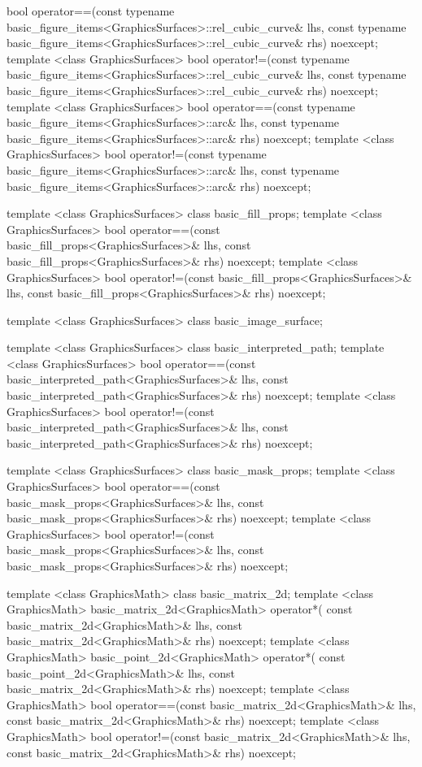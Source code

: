 \begin{codeblock}
{{{{    bool operator==(const typename 
      basic_figure_items<GraphicsSurfaces>::rel_cubic_curve& lhs,
      const typename basic_figure_items<GraphicsSurfaces>::rel_cubic_curve& 
      rhs) noexcept;
    template <class GraphicsSurfaces>
    bool operator!=(const typename 
      basic_figure_items<GraphicsSurfaces>::rel_cubic_curve& lhs,
      const typename basic_figure_items<GraphicsSurfaces>::rel_cubic_curve& 
      rhs) noexcept;
    template <class GraphicsSurfaces>
    bool operator==(const typename basic_figure_items<GraphicsSurfaces>::arc& 
      lhs, const typename basic_figure_items<GraphicsSurfaces>::arc& rhs) 
      noexcept;
    template <class GraphicsSurfaces>
    bool operator!=(const typename basic_figure_items<GraphicsSurfaces>::arc& 
      lhs, const typename basic_figure_items<GraphicsSurfaces>::arc& rhs) 
      noexcept;
    
    template <class GraphicsSurfaces>
    class basic_fill_props;
    template <class GraphicsSurfaces>
    bool operator==(const basic_fill_props<GraphicsSurfaces>& lhs,
      const basic_fill_props<GraphicsSurfaces>& rhs) noexcept;
    template <class GraphicsSurfaces>
    bool operator!=(const basic_fill_props<GraphicsSurfaces>& lhs,
      const basic_fill_props<GraphicsSurfaces>& rhs) noexcept;
    
    template <class GraphicsSurfaces>
    class basic_image_surface;
    
    template <class GraphicsSurfaces>
    class basic_interpreted_path;
    template <class GraphicsSurfaces>
    bool operator==(const basic_interpreted_path<GraphicsSurfaces>& lhs,
      const basic_interpreted_path<GraphicsSurfaces>& rhs) noexcept;
    template <class GraphicsSurfaces>
    bool operator!=(const basic_interpreted_path<GraphicsSurfaces>& lhs,
      const basic_interpreted_path<GraphicsSurfaces>& rhs) noexcept;
    
    
    template <class GraphicsSurfaces>
    class basic_mask_props;
    template <class GraphicsSurfaces>
    bool operator==(const basic_mask_props<GraphicsSurfaces>& lhs,
      const basic_mask_props<GraphicsSurfaces>& rhs) noexcept;
    template <class GraphicsSurfaces>
    bool operator!=(const basic_mask_props<GraphicsSurfaces>& lhs,
      const basic_mask_props<GraphicsSurfaces>& rhs) noexcept;
    
    template <class GraphicsMath>
    class basic_matrix_2d;
    template <class GraphicsMath>
    basic_matrix_2d<GraphicsMath> operator*(
      const basic_matrix_2d<GraphicsMath>& lhs,
      const basic_matrix_2d<GraphicsMath>& rhs) noexcept;
    template <class GraphicsMath>
    basic_point_2d<GraphicsMath> operator*(
      const basic_point_2d<GraphicsMath>& lhs,
      const basic_matrix_2d<GraphicsMath>& rhs) noexcept;
    template <class GraphicsMath>
    bool operator==(const basic_matrix_2d<GraphicsMath>& lhs,
      const basic_matrix_2d<GraphicsMath>& rhs) noexcept;
    template <class GraphicsMath>
    bool operator!=(const basic_matrix_2d<GraphicsMath>& lhs,
      const basic_matrix_2d<GraphicsMath>& rhs) noexcept;
  
}}}}
\end{codeblock}
